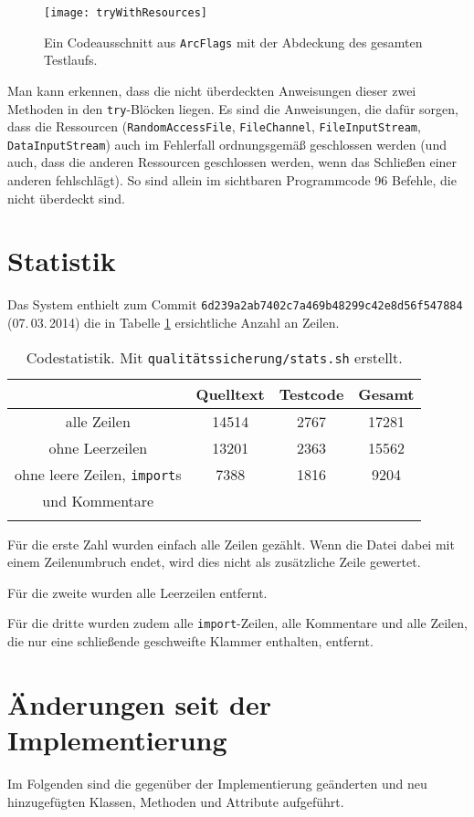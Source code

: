 \documentclass[a4paper, 11pt]{article}
\newcommand{\code}[1]{\texttt{#1}}
\begin{document}
\begin{figure}[H]
\texttt{[image: tryWithResources]}
\caption{Ein Codeausschnitt aus \code{ArcFlags} mit der Abdeckung des gesamten Testlaufs.}
\label{fig:tryWithResources}
\end{figure}

Man kann erkennen, dass die nicht überdeckten Anweisungen dieser zwei Methoden in den \code{try}-Blöcken liegen.
Es sind die Anweisungen, die dafür sorgen, dass die Ressourcen 
(\code{RandomAccessFile}, \code{FileChannel}, \code{FileInputStream}, \code{DataInputStream}) 
auch im Fehlerfall ordnungsgemäß geschlossen werden
(und auch, dass die anderen Ressourcen geschlossen werden,
wenn das Schließen einer anderen fehlschlägt).
So sind allein im sichtbaren Programmcode 96 Befehle, die nicht überdeckt sind.

\newpage
\section{Statistik}
Das System enthielt zum Commit \code{6d239a2ab7402c7a469b48299c42e8d56f547884} (07.\,03.\,2014) die in Tabelle \ref{tab:codestat} ersichtliche Anzahl an Zeilen.\\
\begin{longtable}{||c|c|c||c||}
 & Quelltext & Testcode & Gesamt\\ \hline\hline
alle Zeilen & 14514 & 2767 & 17281\\ \hline
ohne Leerzeilen & 13201 & 2363 & 15562\\ \hline \hline
ohne leere Zeilen, \code{import}s& 7388 & 1816 & 9204\\
 und Kommentare &&& \\\hline
\caption{Codestatistik. Mit \code{qualitätssicherung/stats.sh} erstellt.}
\label{tab:codestat}
\end{longtable}

Für die erste Zahl wurden einfach alle Zeilen gezählt. Wenn die Datei dabei mit einem Zeilenumbruch endet, wird dies nicht als zusätzliche Zeile gewertet.

Für die zweite wurden alle Leerzeilen entfernt.

Für die dritte wurden zudem alle \code{import}-Zeilen, alle Kommentare und alle Zeilen, die nur eine schließende geschweifte Klammer enthalten, entfernt.

\section{Änderungen seit der Implementierung}
Im Folgenden sind die gegenüber der Implementierung geänderten und neu hinzugefügten Klassen, Methoden und Attribute aufgeführt.
\end{document}
